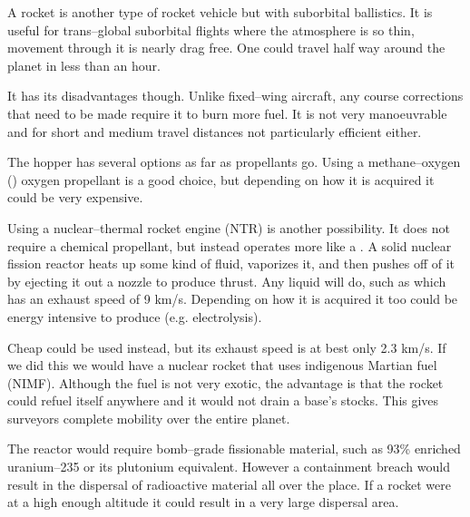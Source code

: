 A rocket  is another type of rocket vehicle but with suborbital ballistics. It is useful for trans--global suborbital flights where the atmosphere is so thin, movement through it is nearly drag free. One could travel half way around the planet in less than an hour. 

It has its disadvantages though. Unlike fixed--wing aircraft, any course corrections that need to be made require it to burn more fuel. It is not very manoeuvrable and for short and medium travel distances not particularly efficient either.

The hopper has several options as far as propellants go. Using a methane--oxygen ()  oxygen propellant is a good choice, but depending on how it is acquired it could be very expensive.

Using a nuclear--thermal rocket engine (NTR) is another possibility. It does not require a chemical propellant, but instead operates more like a . A solid nuclear fission reactor heats up some kind of fluid, vaporizes it, and then pushes off of it by ejecting it out a nozzle to produce thrust. Any liquid will do, such as  which has an exhaust speed of 9 km/s. Depending on how it is acquired it too could be energy intensive to produce (e.g. electrolysis).

Cheap  could be used instead, but its exhaust speed is at best only 2.3 km/s. If we did this we would have a nuclear rocket that uses indigenous Martian fuel (NIMF). Although the fuel is not very exotic, the advantage is that the rocket could refuel itself anywhere and it would not drain a base's  stocks. This gives surveyors complete mobility over the entire planet.

The reactor would require bomb--grade fissionable material, such as 93\% enriched uranium--235 or its plutonium equivalent. However a containment breach would result in the dispersal of radioactive material all over the place. If a rocket were at a high enough altitude it could result in a very large dispersal area.

